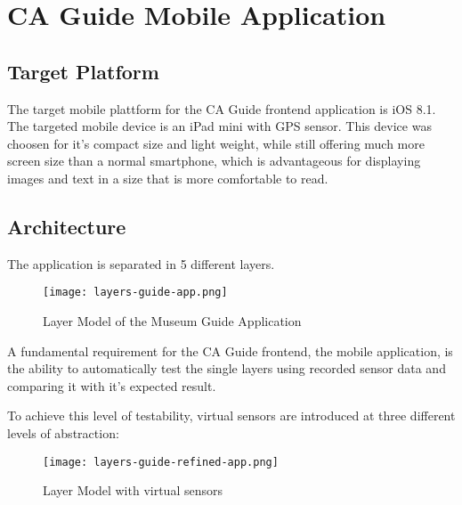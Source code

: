 
\chapter{CA Guide Mobile Application} %

\label{frontend} %



\section{Target Platform}

The target mobile plattform for the CA Guide frontend application is iOS 8.1. The targeted mobile device is an iPad mini with GPS sensor. This device was choosen for it's compact size and light weight, while still offering much more screen size than a normal smartphone, which is advantageous for displaying images and text in a size that is more comfortable to read.

\section{Architecture}

The application is separated in 5 different layers.

\begin{figure}[H]
\centering
\texttt{[image: layers-guide-app.png]}
\caption{Layer Model of the Museum Guide Application}
\end{figure}

A fundamental requirement for the CA Guide frontend, the mobile application, is the ability to automatically test the single layers using recorded sensor data and comparing it with it's expected result.

To achieve this level of testability, virtual sensors are introduced at three different levels of abstraction:
 
\begin{figure}[H]
\centering
\texttt{[image: layers-guide-refined-app.png]}
\caption{Layer Model with virtual sensors}
\end{figure}

